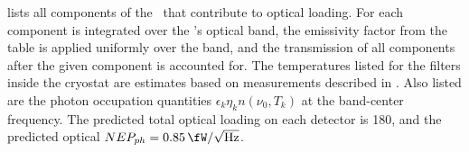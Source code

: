  lists all components of the \Imager\ that contribute to optical loading.
For each component  is integrated over the \Imager's optical band, the emissivity factor from the table is applied uniformly over the band, and the transmission of all components after the given component is accounted for.
The temperatures listed for the filters inside the cryostat are estimates based on measurements described in .
Also listed are the photon occupation quantities $\epsilon_k \eta_k n(\nu_0,T_k)$ at the band-center frequency.
The predicted total optical loading on each detector is \SI{180}{\pW}, and the predicted optical $NEP_{ph} = \Pnoisef{0.85}$.

